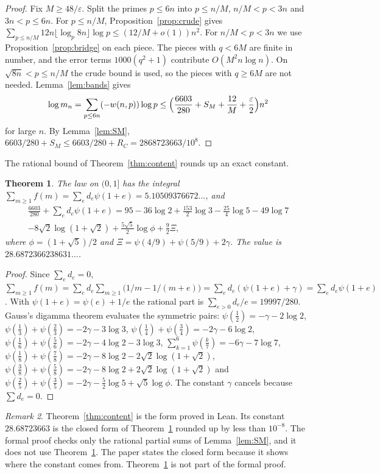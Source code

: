 \documentclass[11pt]{amsart}
\newtheorem{theorem}{Theorem}[section]
\theoremstyle{definition}
\theoremstyle{remark}
\newtheorem{remark}[theorem]{Remark}
\numberwithin{equation}{section}
\begin{document}
\begin{proof}
Fix $M\ge48/\varepsilon$. Split the primes $p\le6n$ into $p\le n/M$, $n/M<p<3n$ and $3n<p\le6n$. For $p\le n/M$,
Proposition~\ref{prop:crude} gives $\sum_{p\le n/M}12n\lfloor\log_p8n\rfloor\log p\le(12/M+o(1))n^2$. For
$n/M<p<3n$ we use Proposition~\ref{prop:bridge} on each piece. The pieces with $q<6M$ are finite in number, and the error
terms $1000(q^2+1)$ contribute $O(M^2n\log n)$. On $\sqrt{8n}<p\le n/M$ the crude bound is used, so the pieces with
$q\ge6M$ are not needed. Lemma~\ref{lem:bands} gives
\[
 \log m_n=\sum_{p\le6n}(-w(n,p))\log p\le\Bigl(\frac{6603}{280}+S_M+\frac{12}M+\frac\varepsilon2\Bigr)n^2
\]
for large $n$. By Lemma~\ref{lem:SM}, $6603/280+S_M\le6603/280+R_C=2868723663/10^8$.
\end{proof}

The rational bound of Theorem~\ref{thm:content} rounds up an exact constant.

\begin{theorem}\label{thm:C01}
The law on $(0,1]$ has the integral $\sum_{m\ge1}f(m)=\sum_ed_e\psi(1+e)=5.10509376672\ldots$, and
\begin{multline*}
 \frac{6603}{280}+\sum_ed_e\psi(1+e)=95-36\log2+\tfrac{153}2\log3-\tfrac{25}4\log5-49\log7\\
 -8\sqrt2\log(1+\sqrt2)+\tfrac{5\sqrt5}2\log\phi+\tfrac92\Xi,
\end{multline*}
where $\phi=(1+\sqrt5)/2$ and $\Xi=\psi(4/9)+\psi(5/9)+2\gamma$. The value is $28.6872366238631\ldots$.
\end{theorem}

\begin{proof}
Since $\sum_ed_e=0$, $\sum_{m\ge1}f(m)=\sum_ed_e\sum_{m\ge1}\bigl(1/m-1/(m+e)\bigr)=\sum_ed_e(\psi(1+e)+\gamma)=\sum_ed_e\psi(1+e)$.
With $\psi(1+e)=\psi(e)+1/e$ the rational part is $\sum_{e>0}d_e/e=19997/280$. Gauss's digamma theorem evaluates the
symmetric pairs: $\psi(\frac12)=-\gamma-2\log2$, $\psi(\frac13)+\psi(\frac23)=-2\gamma-3\log3$,
$\psi(\frac14)+\psi(\frac34)=-2\gamma-6\log2$, $\psi(\frac16)+\psi(\frac56)=-2\gamma-4\log2-3\log3$,
$\sum_{k=1}^6\psi(\frac k7)=-6\gamma-7\log7$, $\psi(\frac18)+\psi(\frac78)=-2\gamma-8\log2-2\sqrt2\log(1+\sqrt2)$,
$\psi(\frac38)+\psi(\frac58)=-2\gamma-8\log2+2\sqrt2\log(1+\sqrt2)$ and
$\psi(\frac25)+\psi(\frac35)=-2\gamma-\frac52\log5+\sqrt5\log\phi$. The constant $\gamma$ cancels because $\sum d_e=0$.
\end{proof}

\begin{remark}\label{rem:C01}
Theorem~\ref{thm:content} is the form proved in Lean. Its constant $28.68723663$ is the closed form of
Theorem~\ref{thm:C01} rounded up by less than $10^{-8}$. The formal proof checks only the rational partial sums of
Lemma~\ref{lem:SM}, and it does not use Theorem~\ref{thm:C01}. The paper states the closed form because it shows
where the constant comes from. Theorem~\ref{thm:C01} is not part of the formal proof.
\end{remark}
\end{document}
